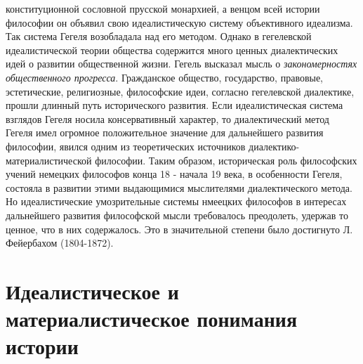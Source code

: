 \documentclass[12pt]{article}
\begin{document}
конституционной сословной прусской монархией, а венцом всей истории философии он объявил свою
идеалистическую систему объективного идеализма.
Так система Гегеля возобладала над его методом. Однако в гегелевской идеалистической теории общества
содержится много ценных диалектических идей о развитии общественной жизни. Гегель высказал мысль о
\textit{закономерностях общественного прогресса}. Гражданское общество, государство, правовые, эстетические,
религиозные, философские идеи, согласно гегелевской диалектике, прошли длинный путь исторического
развития.
Если идеалистическая система взглядов Гегеля носила консервативный характер, то диалектический метод
Гегеля имел огромное положительное значение для дальнейшего развития философии, явился одним из
теоретических источников диалектико-материалистической философии.
Таким образом, историческая роль философских учений немецких философов конца 18 - начала 19 века, в
особенности Гегеля, состояла в развитии этими выдающимися мыслителями диалектического метода. Но
идеалистические умозрительные системы нмеецких философов в интересах дальнейшего развития
философской мысли требовалось преодолеть, удержав то ценное, что в них содержалось.
Это в значительной степени было достигнуто Л. Фейербахом (1804-1872).


\newpage
\section{Идеалистическое и материалистическое понимания истории}


\newpage
\end{document}
